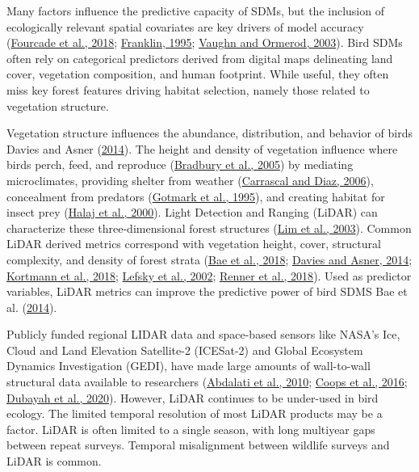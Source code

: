 \documentclass[
]{article}
\begin{document}
Many factors influence the predictive capacity of SDMs, but the inclusion of ecologically relevant spatial covariates are key drivers of model accuracy (\protect\hyperlink{ref-fourcadePaintingsPredictDistribution2018}{Fourcade et al., 2018}; \protect\hyperlink{ref-Franklin1995}{Franklin, 1995}; \protect\hyperlink{ref-Vaughn2003}{Vaughn and Ormerod, 2003}). Bird SDMs often rely on categorical predictors derived from digital maps delineating land cover, vegetation composition, and human footprint. While useful, they often miss key forest features driving habitat selection, namely those related to vegetation structure.

Vegetation structure influences the abundance, distribution, and behavior of birds Davies and Asner (\protect\hyperlink{ref-Davies2014a}{2014}). The height and density of vegetation influence where birds perch, feed, and reproduce (\protect\hyperlink{ref-Bradbury2005}{Bradbury et al., 2005}) by mediating microclimates, providing shelter from weather (\protect\hyperlink{ref-CarrascalDiaz2006}{Carrascal and Diaz, 2006}), concealment from predators (\protect\hyperlink{ref-GotmarkBlomqvist1995}{Gotmark et al., 1995}), and creating habitat for insect prey (\protect\hyperlink{ref-halajImportanceHabitatStructure2000}{Halaj et al., 2000}). Light Detection and Ranging (LiDAR) can characterize these three-dimensional forest structures (\protect\hyperlink{ref-limLiDARRemoteSensing2003}{Lim et al., 2003}). Common LiDAR derived metrics correspond with vegetation height, cover, structural complexity, and density of forest strata (\protect\hyperlink{ref-Bae2018}{Bae et al., 2018}; \protect\hyperlink{ref-Davies2014a}{Davies and Asner, 2014}; \protect\hyperlink{ref-Kortmann2018}{Kortmann et al., 2018}; \protect\hyperlink{ref-Lefsky2002}{Lefsky et al., 2002}; \protect\hyperlink{ref-Renner2018}{Renner et al., 2018}). Used as predictor variables, LiDAR metrics can improve the predictive power of bird SDMS Bae et al. (\protect\hyperlink{ref-Bae2014}{2014}).

Publicly funded regional LIDAR data and space-based sensors like NASA's Ice, Cloud and Land Elevation Satellite-2 (ICESat-2) and Global Ecosystem Dynamics Investigation (GEDI), have made large amounts of wall-to-wall structural data available to researchers (\protect\hyperlink{ref-abdalatiICESat2LaserAltimetry2010}{Abdalati et al., 2010}; \protect\hyperlink{ref-coopsForestStructureHabitat2016}{Coops et al., 2016}; \protect\hyperlink{ref-dubayahGlobalEcosystemDynamics2020a}{Dubayah et al., 2020}). However, LiDAR continues to be under-used in bird ecology. The limited temporal resolution of most LiDAR products may be a factor. LiDAR is often limited to a single season, with long multiyear gaps between repeat surveys. Temporal misalignment between wildlife surveys and LiDAR is common.
\end{document}
